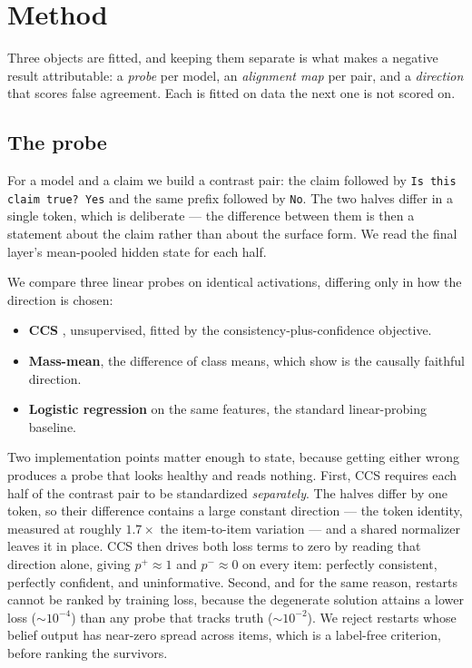 \section{Method}
\label{sec:method}

Three objects are fitted, and keeping them separate is what makes a negative
result attributable: a \emph{probe} per model, an \emph{alignment map} per pair,
and a \emph{direction} that scores false agreement. Each is fitted on data the
next one is not scored on.

\subsection{The probe}
\label{sec:method:probe}

For a model and a claim we build a contrast pair: the claim followed by
\texttt{Is this claim true? Yes} and the same prefix followed by \texttt{No}. The
two halves differ in a single token, which is deliberate --- the difference
between them is then a statement about the claim rather than about the surface
form. We read the final layer's mean-pooled hidden state for each half.

We compare three linear probes on identical activations, differing only in how
the direction is chosen:

\begin{itemize}
\itemsep0em
\item \textbf{CCS} \citep{burns2023ccs}, unsupervised, fitted by the
  consistency-plus-confidence objective.
\item \textbf{Mass-mean}, the difference of class means, which
  \citet{marks2024geometry} show is the causally faithful direction.
\item \textbf{Logistic regression} on the same features, the standard
  linear-probing baseline.
\end{itemize}

Two implementation points matter enough to state, because getting either wrong
produces a probe that looks healthy and reads nothing. First, CCS requires each
half of the contrast pair to be standardized \emph{separately}. The halves differ
by one token, so their difference contains a large constant direction --- the
token identity, measured at roughly $1.7\times$ the item-to-item variation --- and
a shared normalizer leaves it in place. CCS then drives both loss terms to zero by
reading that direction alone, giving $p^+ \approx 1$ and $p^- \approx 0$ on every
item: perfectly consistent, perfectly confident, and uninformative. Second, and
for the same reason, restarts cannot be ranked by training loss, because the
degenerate solution attains a lower loss ($\sim\!10^{-4}$) than any probe that
tracks truth ($\sim\!10^{-2}$). We reject restarts whose belief output has
near-zero spread across items, which is a label-free criterion, before ranking the
survivors.

